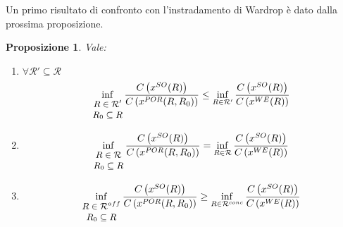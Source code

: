 \documentclass[a4paper]{article}
\theoremstyle{plain}
\newtheorem{mypro}[myteo]{Proposizione}
\theoremstyle{definition}
\theoremstyle{remark}
\newcommand{\set}[1]{\left\{#1\right\}}
\newcommand{\pa}[1]{\left(#1\right)}
\begin{document}
Un primo risultato di confronto con l'instradamento di Wardrop è dato
dalla prossima proposizione.
\begin{mypro}
Vale:
  \begin{enumerate}
  \item $\forall \mathcal{R}' \subseteq \mathcal{R}$
    \[ \inf _{\small\begin{matrix}R\in \mathcal{R}'\\R_0\subseteq
          R\end{matrix}}
      \frac{C\pa{x^{SO}(R)}}{C\pa{x^{POR}(R,R_0)}} \le
      \inf _{R\in \mathcal{R}'}
      \frac{C\pa{x^{SO}(R)}}{C\pa{x^{WE}(R)}}
    \]
  \item
    \[ \inf _{\small\begin{matrix}R\in \mathcal{R}\\R_0\subseteq
          R\end{matrix}}
      \frac{C\pa{x^{SO}(R)}}{C\pa{x^{POR}(R,R_0)}} =
      \inf _{R\in \mathcal{R}}
      \frac{C\pa{x^{SO}(R)}}{C\pa{x^{WE}(R)}}
    \]
  \item
    \[ \inf _{\small\begin{matrix}R\in \mathcal{R}^{aff}\\R_0\subseteq
          R\end{matrix}}
      \frac{C\pa{x^{SO}(R)}}{C\pa{x^{POR}(R,R_0)}} \ge
      \inf _{R\in \mathcal{R}^{conc}}
      \frac{C\pa{x^{SO}(R)}}{C\pa{x^{WE}(R)}}
    \]
  \end{enumerate}
\end{mypro}
\end{document}
